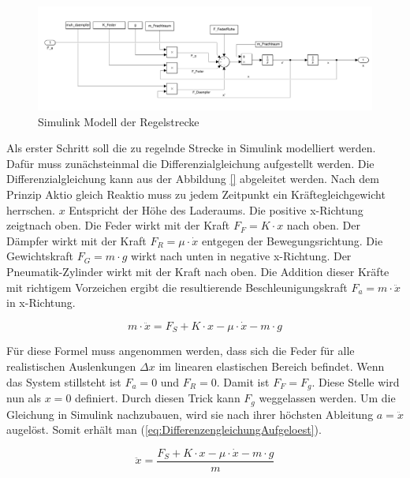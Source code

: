 \begin{figure}[hbt] 
	\centering
		\includegraphics[width=1.0\textwidth]{Bilder/SimulinkStreckenModell.PNG}
	\caption{Simulink Modell der Regelstrecke}
	\label{SimulinkStreckenModell}
\end{figure}

Als erster Schritt soll die zu regelnde Strecke in Simulink modelliert werden. Dafür muss zunächsteinmal die Differenzialgleichung aufgestellt werden.
Die Differenzialgleichung kann aus der Abbildung \ref{} abgeleitet werden. 
Nach dem Prinzip Aktio gleich Reaktio muss zu jedem Zeitpunkt ein Kräftegleichgewicht herrschen.
$x$ Entspricht der Höhe des Laderaums. Die positive x-Richtung zeigtnach oben. Die Feder wirkt mit der Kraft $F_{F} = K \cdot x$ nach oben. Der Dämpfer wirkt mit der Kraft 
$F_{R} = \mu \cdot \dot{x}$ entgegen der Bewegungsrichtung. Die Gewichtskraft $F_{G} = m \cdot g $ wirkt nach unten in negative x-Richtung. Der Pneumatik-Zylinder 
wirkt mit der Kraft  nach oben. Die Addition dieser Kräfte mit richtigem Vorzeichen ergibt die resultierende Beschleunigungskraft $F_{a} = m \cdot \ddot{x}$
in x-Richtung.

\begin{equation}
	m \cdot \ddot{x} = F_{S} + K \cdot x - \mu \cdot \dot{x} - m \cdot g
	\label{eq:Differenzengleichung}
\end{equation}

Für diese Formel muss angenommen werden, dass sich die Feder für alle realistischen Auslenkungen $\Delta x$ im linearen elastischen Bereich befindet. Wenn das System stillsteht ist $F_{a} = 0$ 
und $F_{R} = 0$. Damit ist $F_{F} = F_{g}$. Diese Stelle wird nun als $x = 0$ definiert. Durch diesen Trick kann $F_{g}$ weggelassen werden. 
Um die Gleichung in Simulink nachzubauen, wird sie nach ihrer höchsten Ableitung $a = \ddot{x}$ augelöst. Somit erhält man (\ref{eq:DifferenzengleichungAufgeloest}).

\begin{equation}
	\ddot{x} = \frac{F_{S} + K \cdot x - \mu \cdot \dot{x} - m \cdot g}{m}
	\label{eq:DifferenzengleichungAufgeloest}
\end{equation}

